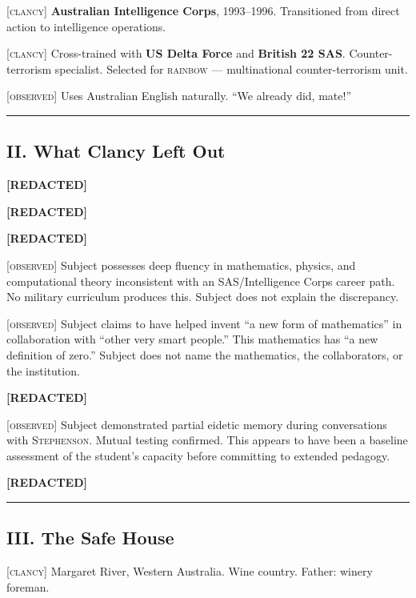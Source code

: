 \textsc{[clancy]} \textbf{Australian Intelligence Corps}, 1993--1996. Transitioned from direct action to intelligence operations.

\textsc{[clancy]} Cross-trained with \textbf{US Delta Force} and \textbf{British 22 SAS}. Counter-terrorism specialist. Selected for \textsc{rainbow} --- multinational counter-terrorism unit.

\textsc{[observed]} Uses Australian English naturally. ``We already did, mate!''

\vspace{1cm}\hrule\vspace{1cm}

\subsection*{II. What Clancy Left Out}
\label{interlude:what-clancy-left-out}

\textbf{[REDACTED]}

\textbf{[REDACTED]}

\textbf{[REDACTED]}

\textsc{[observed]} Subject possesses deep fluency in mathematics, physics, and computational theory inconsistent with an SAS/Intelligence Corps career path. No military curriculum produces this. Subject does not explain the discrepancy.

\textsc{[observed]} Subject claims to have helped invent ``a new form of mathematics'' in collaboration with ``other very smart people.'' This mathematics has ``a new definition of zero.'' Subject does not name the mathematics, the collaborators, or the institution.

\textbf{[REDACTED]}

\textsc{[observed]} Subject demonstrated partial eidetic memory during conversations with \textsc{Stephenson}. Mutual testing confirmed. This appears to have been a baseline assessment of the student's capacity before committing to extended pedagogy.

\textbf{[REDACTED]}

\vspace{1cm}\hrule\vspace{1cm}

\subsection*{III. The Safe House}
\label{interlude:the-safe-house}

\textsc{[clancy]} Margaret River, Western Australia. Wine country. Father: winery foreman.


